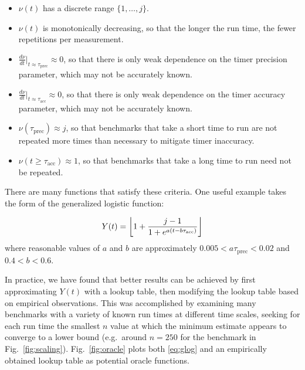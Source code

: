 \documentclass[conference]{IEEEtran}
\DeclarePairedDelimiter\floor{\lfloor}{\rfloor}
\begin{document}
\begin{itemize}
    \item $\nu(t)$ has a discrete range $\{1, \dots, j\}$.
    \item $\nu(t)$ is monotonically decreasing, so that the longer the run time, the fewer repetitions per measurement.
    \item $\frac{d\nu}{dt}|_{t \approx \tau_{\textrm{prec}}} \approx 0$,
    so that there is only weak dependence on the timer precision parameter,
    which may not be accurately known.
    \item $\frac{d\nu}{dt}|_{t \approx \tau_{\textrm{acc}}} \approx 0$,
    so that there is only weak dependence on the timer accuracy parameter,
    which may not be accurately known.
    \item $\nu(\tau_{\textrm{prec}}) \approx j$, so that benchmarks that take a     short time to run are not repeated more times than necessary to mitigate timer inaccuracy.
    \item $\nu(t \ge \tau_{\textrm{acc}}) \approx 1$, so that benchmarks that take a long time to run need not be repeated.
\end{itemize}

There are many functions that satisfy these criteria. One useful example takes
the form of the generalized logistic function:

\begin{equation}
\label{eq:glog}
    Y(t) = \floor*{1 + \frac{j - 1}{1 + e^{a (t - b \tau_{\textrm{acc}})}}}
\end{equation}
%
where reasonable values of $a$ and $b$ are approximately $0.005 < a \tau_{\textrm{prec}} < 0.02$ and $0.4 < b <
0.6$.

In practice, we have found that better results can be achieved by first
approximating $Y(t)$ with a lookup table, then modifying the lookup table based
on empirical observations. This was accomplished by examining many benchmarks
with a variety of known run times at different time scales, seeking for each
run time the smallest $n$ value at which the minimum estimate appears to
converge to a lower bound (e.g.\ around $n = 250$ for the benchmark in
Fig.~\ref{fig:scaling}). Fig.~\ref{fig:oracle} plots both \eqref{eq:glog} and an
empirically obtained lookup table as potential oracle functions.
\end{document}
